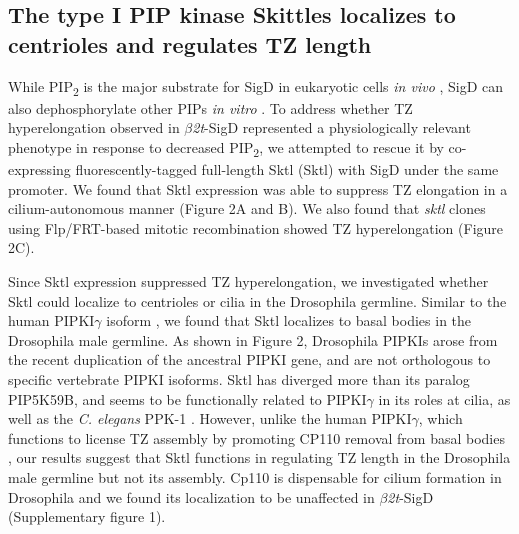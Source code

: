 \documentclass[12pt, twoside, letterpaper]{article}
\newcommand{\PIP}{PIP\textsubscript{2}}
\newcommand{\sigd}{$\beta$\textit{2t}-SigD}
\begin{document}
\subsection{The type I PIP kinase Skittles localizes to centrioles and regulates TZ length}
While \PIP{} is the major substrate for SigD in eukaryotic cells \textit{in vivo}
\citep{terebiznik2002elimination, zhou2001salmonella, sengupta2013depletion},
SigD can also dephosphorylate other PIPs \textit{in vitro}
\citep{norris1998sopb}.
To address whether TZ hyperelongation observed in \sigd{} represented a
physiologically relevant phenotype in response to decreased \PIP{},
we attempted to rescue it by
co-expressing fluorescently-tagged full-length Sktl (Sktl) with SigD
under the same promoter.
We found that Sktl expression was able to suppress TZ elongation
in a cilium-autonomous manner (Figure 2A and B).
We also found that \textit{sktl} clones using Flp/FRT-based mitotic recombination
showed TZ hyperelongation (Figure 2C).

Since Sktl expression suppressed TZ hyperelongation,
we investigated whether Sktl could localize to centrioles or cilia
in the Drosophila germline.
Similar to the human PIPKI$\gamma$ isoform \citep{xu2014pipkigamma},
we found that Sktl localizes to basal bodies in the Drosophila male germline.
As shown in Figure 2, Drosophila PIPKIs arose from the recent duplication of
the ancestral PIPKI gene,
and are not orthologous to specific vertebrate PIPKI isoforms.
Sktl has diverged more than its paralog PIP5K59B, and seems
to be functionally related to PIPKI$\gamma$ in its roles at cilia,
as well as the \textit{C. elegans} PPK-1 \citep{xu2014pipkigamma}.
However, unlike the human PIPKI$\gamma$, which functions to license TZ assembly
by promoting CP110 removal from basal bodies \citep{xu2016phosphatidylinositol},
our results suggest that Sktl functions in
regulating TZ length in the Drosophila male germline
but not its assembly.
Cp110 is dispensable for cilium formation in Drosophila \citep{franz2013cp110}
and we found its localization to be unaffected in \sigd{} (Supplementary figure 1).
\end{document}
